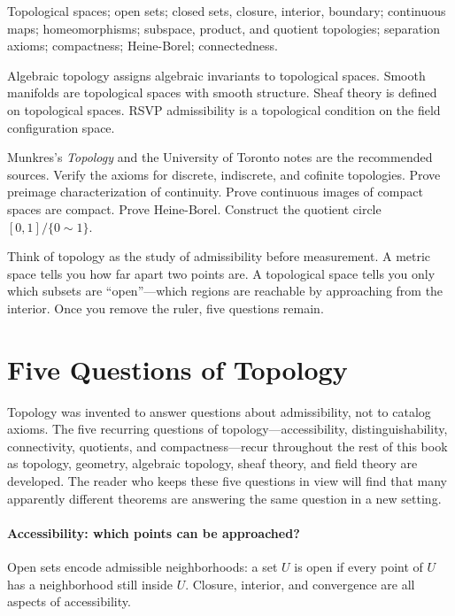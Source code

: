 \documentclass[12pt, twoside, openright, a4paper]{book}
\begin{document}
\begin{structures}
Topological spaces; open sets; closed sets, closure, interior, boundary; continuous maps; homeomorphisms; subspace, product, and quotient topologies; separation axioms; compactness; Heine-Borel; connectedness.
\end{structures}

\begin{dependencies}
Algebraic topology assigns algebraic invariants to topological spaces.
Smooth manifolds are topological spaces with smooth structure.
Sheaf theory is defined on topological spaces.
RSVP admissibility is a topological condition on the field configuration space.
\end{dependencies}

\begin{exercises_box}
Munkres's \textit{Topology} and the University of Toronto notes are the recommended sources.
Verify the axioms for discrete, indiscrete, and cofinite topologies.
Prove preimage characterization of continuity.
Prove continuous images of compact spaces are compact.
Prove Heine-Borel.
Construct the quotient circle $[0,1]/\{0\sim 1\}$.
\end{exercises_box}


Think of topology as the study of admissibility before measurement. A metric space tells you how far apart two points are. A topological space tells you only which subsets are ``open''---which regions are reachable by approaching from the interior. Once you remove the ruler, five questions remain.

\section{Five Questions of Topology}

Topology was invented to answer questions about admissibility, not to catalog axioms.
The five recurring questions of topology---accessibility, distinguishability, connectivity, quotients, and compactness---recur throughout the rest of this book as topology, geometry, algebraic topology, sheaf theory, and field theory are developed.
The reader who keeps these five questions in view will find that many apparently different theorems are answering the same question in a new setting.

\paragraph{Accessibility: which points can be approached?}
Open sets encode admissible neighborhoods: a set $U$ is open if every point of $U$ has a neighborhood still inside $U$.
Closure, interior, and convergence are all aspects of accessibility.
\end{document}
